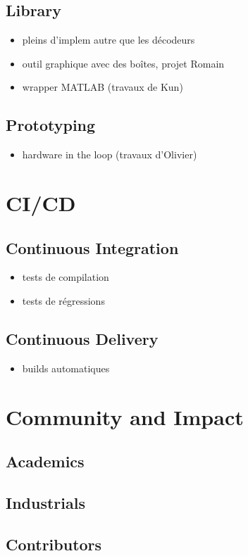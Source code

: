 \subsection{Library~\cite{Cassagne2019a}}

\begin{itemize}
  \item pleins d'implem autre que les décodeurs
  \item outil graphique avec des boîtes, projet Romain
  \item wrapper MATLAB (travaux de Kun)
\end{itemize}

\subsection{Prototyping~\cite{Cassagne2017,Cassagne2017a}}

\begin{itemize}
  \item hardware in the loop (travaux d'Olivier)
\end{itemize}

\section{CI/CD}

\subsection{Continuous Integration}
\begin{itemize}
  \item tests de compilation
  \item tests de régressions
\end{itemize}

\subsection{Continuous Delivery}

\begin{itemize}
  \item builds automatiques
\end{itemize}

\section{Community and Impact}

\subsection{Academics}
\subsection{Industrials}
\subsection{Contributors}
